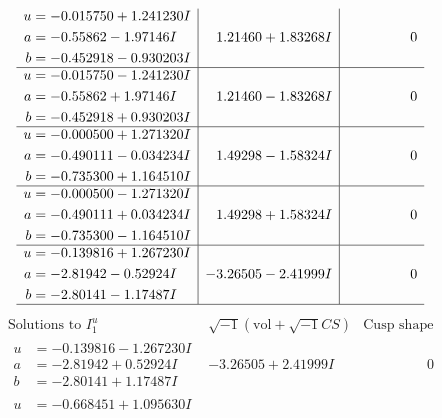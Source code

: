 \documentclass[1p]{elsarticle_modified}
\theoremstyle{definition}
\newcommand{\I}{\sqrt{-1}}
\begin{document}
$$\begin{array}{c|c|c}
\begin{aligned}
u &= -0.015750 + 1.241230 I \\
a &= -0.55862 - 1.97146 I \\
b &= -0.452918 - 0.930203 I\end{aligned}
 & \phantom{-}1.21460 + 1.83268 I & \phantom{-0.000000 } 0 \\ \hline\begin{aligned}
u &= -0.015750 - 1.241230 I \\
a &= -0.55862 + 1.97146 I \\
b &= -0.452918 + 0.930203 I\end{aligned}
 & \phantom{-}1.21460 - 1.83268 I & \phantom{-0.000000 } 0 \\ \hline\begin{aligned}
u &= -0.000500 + 1.271320 I \\
a &= -0.490111 - 0.034234 I \\
b &= -0.735300 + 1.164510 I\end{aligned}
 & \phantom{-}1.49298 - 1.58324 I & \phantom{-0.000000 } 0 \\ \hline\begin{aligned}
u &= -0.000500 - 1.271320 I \\
a &= -0.490111 + 0.034234 I \\
b &= -0.735300 - 1.164510 I\end{aligned}
 & \phantom{-}1.49298 + 1.58324 I & \phantom{-0.000000 } 0 \\ \hline\begin{aligned}
u &= -0.139816 + 1.267230 I \\
a &= -2.81942 - 0.52924 I \\
b &= -2.80141 - 1.17487 I\end{aligned}
 & -3.26505 - 2.41999 I & \phantom{-0.000000 } 0\\
 \hline 
 \end{array}$$\newpage$$\begin{array}{c|c|c}  
\text{Solutions to }I^u_{1}& \I (\text{vol} + \sqrt{-1}CS) & \text{Cusp shape}\\
 \hline 
\begin{aligned}
u &= -0.139816 - 1.267230 I \\
a &= -2.81942 + 0.52924 I \\
b &= -2.80141 + 1.17487 I\end{aligned}
 & -3.26505 + 2.41999 I & \phantom{-0.000000 } 0 \\ \hline\begin{aligned}
u &= -0.668451 + 1.095630 I \\

\end{aligned}
\end{array}$$
\end{document}
